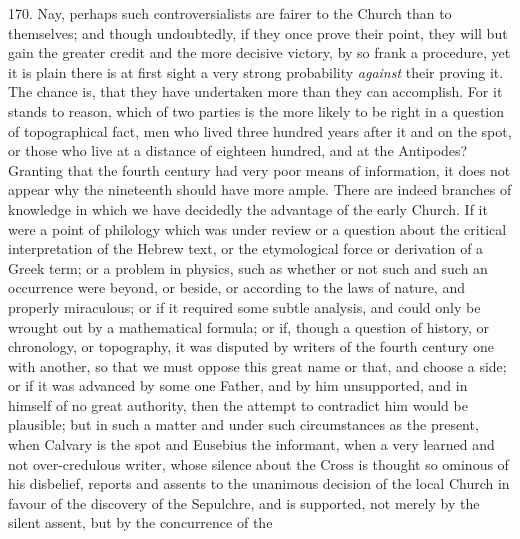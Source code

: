 170.
Nay, perhaps such controversialists are fairer to the Church than to
themselves; and though undoubtedly, if they once prove their point,
they will but gain the greater credit and the more decisive victory,
by so frank a procedure, yet it is plain there is at first sight a
very strong probability \emph{against} their proving it. The chance
is, that they have undertaken more than they can accomplish. For it
stands to reason, which of two parties is the more likely to be right
in a question of topographical fact, men who lived three hundred years
after it and on the spot, or those who live at a distance of eighteen
hundred, and at the Antipodes? Granting that the fourth century had
very poor means of information, it does not appear why the nineteenth
should have more ample. There are indeed branches of knowledge in
which we have decidedly the advantage of the early Church. If it were
a point of philology which was under review or a question about the
critical interpretation of the Hebrew text, or the etymological force
or derivation of a Greek term; or a problem in physics, such as
whether or not such and such an occurrence were beyond, or beside, or
according to the laws of nature, and properly miraculous; or if
it required some subtle analysis, and could only be wrought out by a
mathematical formula; or if, though a question of history, or
chronology, or topography, it was disputed by writers of the fourth
century one with another, so that we must oppose this great name or
that, and choose a side; or if it was advanced by some one Father, and
by him unsupported, and in himself of no great authority, then the
attempt to contradict him would be plausible; but in such a matter
and under such circumstances as the present, when Calvary is the spot
and Eusebius the informant, when a very learned and not over-credulous
writer, whose silence about the Cross is thought so ominous of his
disbelief, reports and assents to the unanimous decision of the local
Church in favour of the discovery of the Sepulchre, and is supported,
not merely by the silent assent, but by the concurrence of the
